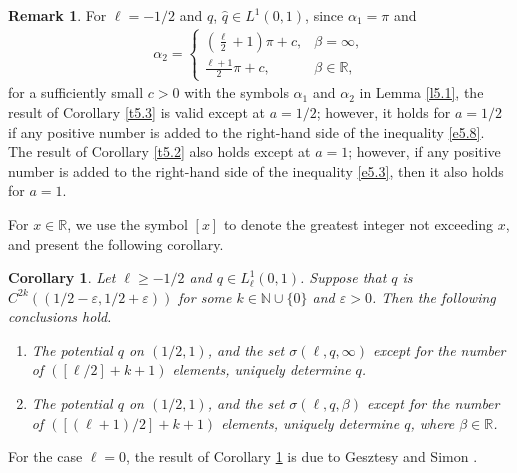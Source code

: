 \documentclass[reqno,12pt,centertags]{amsart}
\numberwithin{equation}{section}
\newtheorem{corollary}[theorem]{Corollary}
\theoremstyle{definition}
\newtheorem{remark}{Remark}[section]
\begin{document}
\begin{remark}\label{r5.1}
For $\ell=-1/2$ and $q$, $\hat{q}\in L^1(0,1)$,
since $\alpha_{1}=\pi$ and 
\begin{align*}
\alpha_{2}=
\begin{cases}
(\frac{\ell}{2}+1)\pi+c, &\beta=\infty, \\
\frac{\ell+1}{2}\pi+c, &\beta\in\mathbb{R},
\end{cases}
\end{align*}
for a sufficiently small $c>0$ with the symbols $\alpha_{1}$ and $\alpha_{2}$ in Lemma \ref{l5.1}, the result of Corollary \ref{t5.3} is valid except at $a = 1/2$; however,  it holds for $a = 1/2$ if any positive number is added to the right-hand side of the inequality \eqref{e5.8}.
The result of Corollary \ref{t5.2} also holds except at $a = 1$; however, if any positive number is added to the right-hand side of the inequality \eqref{e5.3}, then it also holds for $a = 1$. 

\end{remark}


For $x\in\mathbb{R}$, we use the symbol $[x]$ to denote the greatest integer not exceeding $x$, and present the following corollary. 



\begin{corollary}\label{t5.6}
Let $\ell\geq-1/2$ and $q\in L_{\ell}^{1}(0,1)$. 
Suppose that $q$ is $C^{2 k}((1/2-\varepsilon, 1/2+\varepsilon))$ for some $k\in\mathbb{N}\cup\{0\}$ and $\varepsilon>0$. Then the following conclusions hold.
\begin{enumerate}[label=\textnormal{(\arabic*).}]
\item The potential $q$ on $(1/2,1)$, and the set $\sigma(\ell,q,\infty)$ except for the number of $\left([\ell/2]+k+1\right)$ elements, uniquely determine $q$. 
\item The potential $q$ on $(1/2,1)$, and the set $\sigma(\ell,q,\beta)$ except for the number of $\left([(\ell+1)/2]+k+1\right)$ elements, uniquely determine $q$, where $\beta\in\mathbb{R}$. 
\end{enumerate}
\end{corollary}

For the case $\ell=0$, the result of Corollary \ref{t5.6} is due to Gesztesy and Simon \cite[Theorem 1.2]{GSb2000}. 
\end{document}

